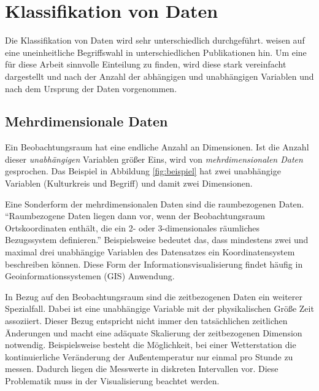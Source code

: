 \documentclass[a4paper, 
               12pt,
               DIV=calc,
               version=first,
               pdftex,
               headsepline,
               footsepline,
               bibtotocnumbered,
               liststotocnumbered]{scrreprt}
\begin{document}
\section{Klassifikation von Daten}
\label{sec:KlassifikationDaten}

Die Klassifikation von Daten wird sehr unterschiedlich durchgeführt.
\citep{Schumann} weisen auf eine uneinheitliche Begriffswahl in unterschiedlichen
Publikationen hin.
Um eine für diese Arbeit sinnvolle Einteilung zu finden, wird diese stark vereinfacht dargestellt und nach der Anzahl der abhängigen und
unabhängigen Variablen und nach dem Ursprung der Daten vorgenommen.

\subsection{Mehrdimensionale Daten}
Ein Beobachtungsraum hat eine endliche Anzahl an Dimensionen. Ist die Anzahl
dieser \textit{unabhängigen} Variablen größer Eins, wird von \textit{mehrdimensionalen Daten} gesprochen. Das Beispiel
in Abbildung \ref{fig:beispiel} hat zwei unabhängige
Variablen (Kulturkreis und Begriff) und damit zwei Dimensionen.

Eine Sonderform der mehrdimensionalen Daten sind die raumbezogenen Daten.
"`Raumbezogene Daten liegen dann vor, wenn der Beobachtungsraum Ortskoordinaten enthält,
die ein 2- oder 3-dimensionales räumliches Bezugssystem definieren."'\citep[S.\,220]{Schumann}
Beispielsweise bedeutet das, dass mindestens zwei und maximal drei unabhängige Variablen des Datensatzes
ein Koordinatensystem beschreiben können. Diese Form der Informationsvisualisierung findet häufig
in Geoinformationssystemen (GIS) Anwendung.

In Bezug auf den Beobachtungsraum sind die zeitbezogenen Daten ein weiterer Spezialfall.
Dabei ist eine unabhängige Variable mit der physikalischen Größe Zeit assoziiert.
Dieser Bezug entspricht nicht immer den tatsächlichen zeitlichen Änderungen und macht
eine adäquate Skalierung der zeitbezogenen Dimension notwendig.
Beispielsweise besteht die Möglichkeit, bei einer Wetterstation die kontinuierliche Veränderung der Außentemperatur
nur einmal pro Stunde zu messen. Dadurch liegen die Messwerte in diskreten Intervallen vor.
Diese Problematik muss in der Visualisierung beachtet werden.
\end{document}

